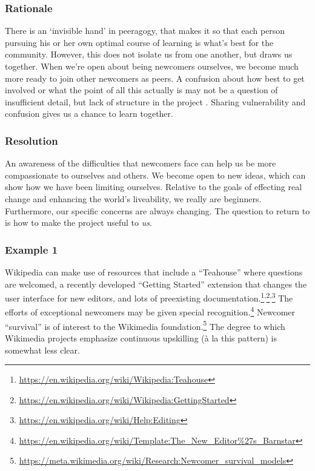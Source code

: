%
\subsubsection*{Rationale} 
There is an `invisible hand' in peeragogy, that makes it so that
each person pursuing his or her own optimal course of learning is
what's best for the community.  However, this does not isolate us from
one another, but draws us together.
%
When we're open about being newcomers ourselves, we become much more
ready to join other newcomers as peers. A
 confusion about how best to get involved
or what the point of all this actually is may not be a question of
insufficient detail, but lack of structure in the project
.  Sharing vulnerability and confusion gives us a chance to learn together.
%

\subsubsection*{Resolution}
An awareness of the difficulties that newcomers face can
help us be more compassionate to ourselves and others.  We
become open to new ideas, which can show how we have
been limiting ourselves.
%
Relative to the goals of effecting real change and enhancing the
world's liveability, we really are beginners.  Furthermore, our
specific concerns are always changing.  The question to return to is
how to make the project useful to \emph{us}.

\subsubsection*{Example 1} Wikipedia  can make use of resources that
include a ``Teahouse'' where questions are welcomed, a recently
developed ``Getting Started'' extension that changes the user
interface for new editors, and lots of preexisting
documentation.\footnote{\url{https://en.wikipedia.org/wiki/Wikipedia:Teahouse}}\textsuperscript{,}\footnote{\url{https://en.wikipedia.org/wiki/Wikipedia:GettingStarted}}\textsuperscript{,}\footnote{\url{https://en.wikipedia.org/wiki/Help:Editing}}
The efforts of exceptional newcomers may be given special
recognition.\footnote{\url{https://en.wikipedia.org/wiki/Template:The_New_Editor\%27s_Barnstar}}
Newcomer ``survival'' is of interest to the Wikimedia
foundation.\footnote{\url{https://meta.wikimedia.org/wiki/Research:Newcomer_survival_models}}
The degree to which Wikimedia projects emphasize continuous upskilling
(\`a la this pattern) is somewhat less clear.

